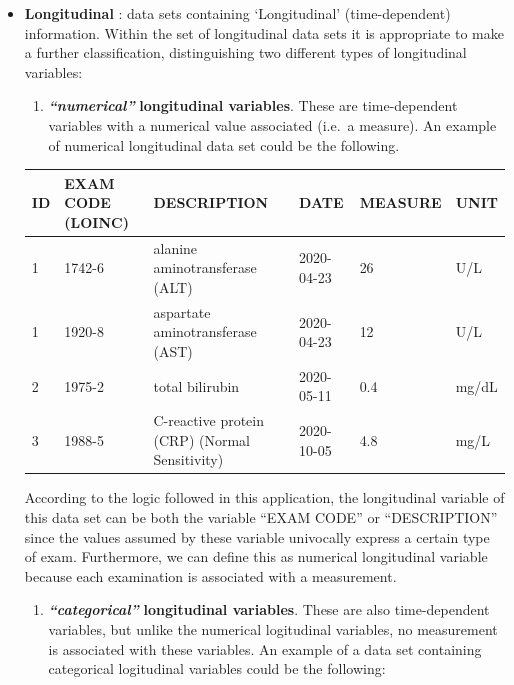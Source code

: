 \documentclass[
]{book}
\providecommand{\tightlist}{%
  \setlength{\itemsep}{0pt}\setlength{\parskip}{0pt}}
\begin{document}
\begin{itemize}
\item
  \textbf{Longitudinal} : data sets containing `Longitudinal' (time-dependent) information.
  Within the set of longitudinal data sets it is appropriate to make a further classification, distinguishing two different types of longitudinal variables:

  \begin{enumerate}
  \def\labelenumi{\arabic{enumi}.}
  \tightlist
  \item
    \textbf{\emph{``numerical''}} \textbf{longitudinal variables}. These are time-dependent variables with a numerical value associated (i.e.~a measure).
    An example of numerical longitudinal data set could be the following.
  \end{enumerate}

  \begin{longtable}[]{@{}llllll@{}}
  \toprule
  ID & EXAM CODE (LOINC) & DESCRIPTION & DATE & MEASURE & UNIT \\
  \midrule
  \endhead
  1 & 1742-6 & alanine aminotransferase (ALT) & 2020-04-23 & 26 & U/L \\
  1 & 1920-8 & aspartate aminotransferase (AST) & 2020-04-23 & 12 & U/L \\
  2 & 1975-2 & total bilirubin & 2020-05-11 & 0.4 & mg/dL \\
  3 & 1988-5 & C-reactive protein (CRP) (Normal Sensitivity) & 2020-10-05 & 4.8 & mg/L \\
  \bottomrule
  \end{longtable}

  According to the logic followed in this application, the longitudinal variable of this data set can be both the variable ``EXAM CODE'' or ``DESCRIPTION'' since the values assumed by these variable univocally express a certain type of exam. Furthermore, we can define this as numerical longitudinal variable because each examination is associated with a measurement.

  \begin{enumerate}
  \def\labelenumi{\arabic{enumi}.}
  \setcounter{enumi}{1}
  \tightlist
  \item
    \textbf{\emph{``categorical''}} \textbf{longitudinal variables}. These are also time-dependent variables, but unlike the numerical logitudinal variables, no measurement is associated with these variables.
    An example of a data set containing categorical logitudinal variables could be the following:
  \end{enumerate}


\end{itemize}
\end{document}
